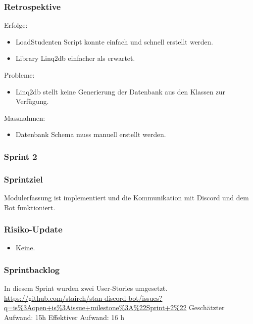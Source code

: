 \documentclass[a4paper, table]{article}
\begin{document}
\subsubsection*{Retrospektive}
Erfolge:
\begin{itemize}
    \item LoadStudenten Script konnte einfach und schnell erstellt werden.
    \item Library Linq2db einfacher als erwartet.
\end{itemize}
Probleme:
\begin{itemize}
    \item Linq2db stellt keine Generierung der Datenbank aus den Klassen zur Verfügung.
\end{itemize}
Massnahmen:
\begin{itemize}
    \item Datenbank Schema muss manuell erstellt werden.
\end{itemize}
\newpage

\subsubsection{Sprint 2}
\subsubsection*{Sprintziel}
Modulerfassung ist implementiert und die Kommunikation mit Discord und dem Bot funktioniert.

\subsubsection*{Risiko-Update}
\begin{itemize}
    \item Keine.
\end{itemize}

\subsubsection*{Sprintbacklog}
In diesem Sprint wurden zwei User-Stories umgesetzt.\\
\url{https://github.com/stairch/stan-discord-bot/issues?q=is%3Aopen+is%3Aissue+milestone%3A%22Sprint+2%22}
\newline
Geschätzter Aufwand: 15h
\newline
Effektiver Aufwand: 16 h
\end{document}

